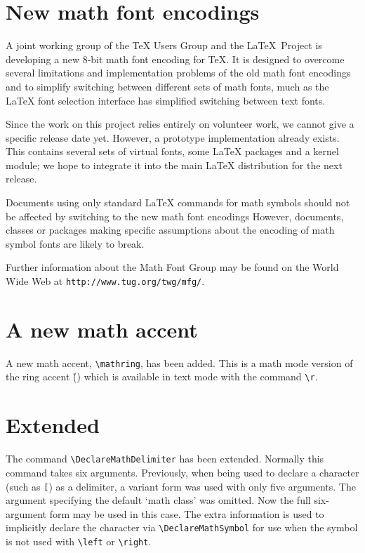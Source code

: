 \documentclass{ltnews}
\begin{document}
\maketitle


\section{New math font encodings}

A joint working group of the \TeX{} Users Group and the \LaTeX\
Project  is developing a new 8-bit math font encoding for \TeX{}.
It is designed to overcome several limitations and implementation
problems of the old math font encodings and to simplify switching
between different sets of math fonts, much as the \LaTeX{} font
selection interface has simplified switching between text fonts.

Since the work on this project relies entirely on volunteer work, we
cannot give a specific release date yet.  However, a prototype
implementation already exists.  This contains several sets of virtual
fonts, some \LaTeX{} packages and a kernel module; we hope to
integrate it into the main \LaTeX{} distribution for the next
release.

Documents using only standard \LaTeX{} commands for math symbols
should not be affected by switching to the new math font encodings
However, documents, classes or packages making specific assumptions
about the encoding of math symbol fonts are likely to break.

Further information about the Math Font Group may be found on
the World Wide Web at \texttt{http://www.tug.org/twg/mfg/}.


\section{A new math accent}

A new math accent, \verb|\mathring|, has been added. This is a math mode
version of the ring accent (\r{}) which is available in text
mode with the command \verb|\r|.

\section{Extended }

The command \verb|\DeclareMathDelimiter| has been extended.
Normally this command takes six arguments. Previously, when being used
to declare a character (such as \texttt{[}) as a delimiter, a variant
form was used with only five arguments. The argument specifying the
default `math class' was omitted. Now the full six-argument form may be
used in this case. The extra information is used to implicitly declare
the character via \verb|\DeclareMathSymbol| for use when the symbol is
not used with \verb|\left| or \verb|\right|.
\end{document}
